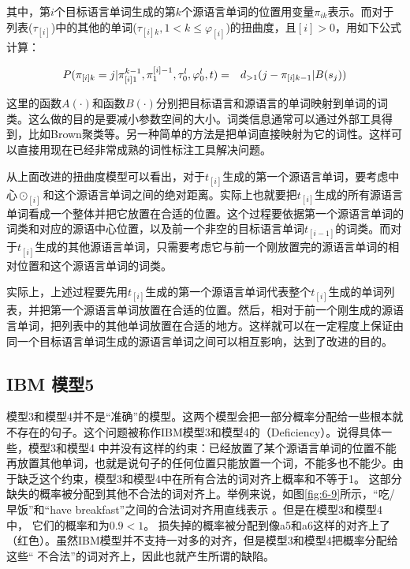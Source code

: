 \noindent 其中，第$i$个目标语言单词生成的第$k$个源语言单词的位置用变量$\pi_{ik}$表示。而对于列表($\tau_{[i]}$)中的其他的单词($\tau_{[i]k},1 < k \le \varphi_{[i]}$)的扭曲度，且$[i]>0$，用如下公式计算：

\begin{eqnarray}
{P}(\pi_{[i]k}=j|{\pi}_{[i]1}^{k-1},\pi_1^{[i]-1},\tau_0^l,\varphi_0^l,{t}) & = & d_{>1}(j-\pi_{[i]k-1}|B(s_j))
\label{eq:6-23}
\end{eqnarray}

\parinterval 这里的函数$A(\cdot)$和函数$B(\cdot)$分别把目标语言和源语言的单词映射到单词的词类。这么做的目的是要减小参数空间的大小。词类信息通常可以通过外部工具得到，比如Brown聚类等。另一种简单的方法是把单词直接映射为它的词性。这样可以直接用现在已经非常成熟的词性标注工具解决问题。

\parinterval 从上面改进的扭曲度模型可以看出，对于$t_{[i]}$生成的第一个源语言单词，要考虑中心$\odot_{[i]}$和这个源语言单词之间的绝对距离。实际上也就要把$t_{[i]}$生成的所有源语言单词看成一个整体并把它放置在合适的位置。这个过程要依据第一个源语言单词的词类和对应的源语中心位置，以及前一个非空的目标语言单词$t_{[i-1]}$的词类。而对于$t_{[i]}$生成的其他源语言单词，只需要考虑它与前一个刚放置完的源语言单词的相对位置和这个源语言单词的词类。

\parinterval 实际上，上述过程要先用$t_{[i]}$生成的第一个源语言单词代表整个$t_{[i]}$生成的单词列表，并把第一个源语言单词放置在合适的位置。然后，相对于前一个刚生成的源语言单词，把列表中的其他单词放置在合适的地方。这样就可以在一定程度上保证由同一个目标语言单词生成的源语言单词之间可以相互影响，达到了改进的目的。


\subsection{ IBM 模型5}

\parinterval 模型3和模型4并不是“准确”的模型。这两个模型会把一部分概率分配给一些根本就不存在的句子。这个问题被称作IBM模型3和模型4的{\small{}}（Deficiency）。说得具体一些，模型3和模型4 中并没有这样的约束：已经放置了某个源语言单词的位置不能再放置其他单词，也就是说句子的任何位置只能放置一个词，不能多也不能少。由于缺乏这个约束，模型3和模型4中在所有合法的词对齐上概率和不等于1。 这部分缺失的概率被分配到其他不合法的词对齐上。举例来说，如图\ref{fig:6-9}所示，“吃/早饭”和“have breakfast”之间的合法词对齐用直线表示 。但是在模型3和模型4中， 它们的概率和为$0.9<1$。 损失掉的概率被分配到像a5和a6这样的对齐上了（红色）。虽然IBM模型并不支持一对多的对齐，但是模型3和模型4把概率分配给这些“ 不合法”的词对齐上，因此也就产生所谓的缺陷。

